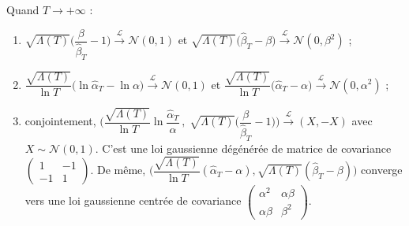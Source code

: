 \begin{theoreme}\label{thm:tcl}
Quand $T\to+\infty$ :
\begin{enumerate}
\item $\sqrt{\Lambda(T)}\Big(\dfrac{\beta}{\hat\beta_T}-1\Big)\xrightarrow{\mathcal{L}}\mathcal{N}(0,1)$ et $\sqrt{\Lambda(T)}\big(\hat\beta_T-\beta\big)\xrightarrow{\mathcal{L}}\mathcal{N}(0,\beta^2)$ ;
\item $\dfrac{\sqrt{\Lambda(T)}}{\ln T}\big(\ln\hat\alpha_T-\ln\alpha\big)\xrightarrow{\mathcal{L}}\mathcal{N}(0,1)$ et $\dfrac{\sqrt{\Lambda(T)}}{\ln T}\big(\hat\alpha_T-\alpha\big)\xrightarrow{\mathcal{L}}\mathcal{N}(0,\alpha^2)$ ;
\item conjointement, $\Big(\dfrac{\sqrt{\Lambda(T)}}{\ln T}\ln\dfrac{\hat\alpha_T}{\alpha}\,,\;\sqrt{\Lambda(T)}\Big(\dfrac{\beta}{\hat\beta_T}-1\Big)\Big)\xrightarrow{\mathcal{L}}(X,-X)$ avec $X\sim\mathcal{N}(0,1)$. C'est une loi gaussienne dégénérée de matrice de covariance $\begin{pmatrix}1&-1\\-1&1\end{pmatrix}$. De même, $\Big(\dfrac{\sqrt{\Lambda(T)}}{\ln T}(\hat\alpha_T-\alpha),\sqrt{\Lambda(T)}(\hat\beta_T-\beta)\Big)$ converge vers une loi gaussienne centrée de covariance $\begin{pmatrix}\alpha^2&\alpha\beta\\\alpha\beta&\beta^2\end{pmatrix}$.
\end{enumerate}
\end{theoreme}

